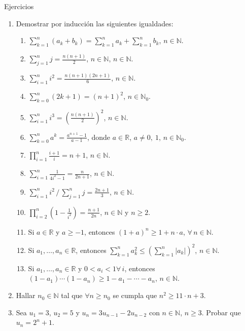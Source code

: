 \begin{section}{Ejercicios}
\begin{enumerate}
        \item Demostrar por inducción  las siguientes igualdades:
        \begin{enumerate}
            \item  $\displaystyle{ \sum_{k=1}^n (a_k + b_k) = \sum_{k=1}^n a_k + \sum_{k=1}^n b_k}$, $n\in \mathbb N$.
            \item  $\displaystyle{ \sum_{j=1}^n j = \frac{n(n+1)}{2}}$, $n\in \mathbb N$, $n\in \mathbb N$.
            \item  $\displaystyle{ \sum_{i=1}^n i^2 = \frac{n(n+1)(2n+1)}{6}}$, $n\in \mathbb N$.
            \item  $\displaystyle{ \sum_{k=0}^n (2k+1) = (n+1)^2}$, $n\in \mathbb N_0$.
            \item  $\displaystyle{ \sum_{i=1}^n i^3 = \left( \frac{n(n+1)}{2 }\right)^2}$, $n\in \mathbb N$.
            \item  $\displaystyle{ \sum_{k=0}^n a^k = \frac{a^{n+1}-1}{a-1}}$, donde $a\in {\mathbb R}$, $a \neq 0,\ 1$, $n\in \mathbb N_0$.
            \item  $\displaystyle{ \prod_{i=1}^n \frac{i+1}{i} = n+1}$, $n\in \mathbb N$.
            \item $\displaystyle{ \sum_{i=1}^n \frac{1}{4i^2-1} = \frac{n}{2n+1}}$, $n\in \mathbb N$.
            \item $\displaystyle{ \sum_{i=1}^n i^2\, /\, \sum_{j=1}^n j = \frac{2n+1}{3}}$, $n\in \mathbb N$.
            \item $\displaystyle{ \prod_{i=2}^n \left(1-\frac{1}{i^2}\right) = \frac{n+1}{2n}}$, $n\in \mathbb N$ y $ n\ge 2$.
            \item Si $a\in \mathbb R$ y $a\geq -1$, entonces $(1+a)^n\geq 1+n\cdot a$, $\forall \, n \in \mathbb N$.
            \item Si $a_1,\dots,a_n \in \mathbb R$, entonces $\displaystyle{\sum_{k=1}^n a_{k}^{2}\leq \left(\sum_{k=1}^n |a_{k}|\right)^{2}}$, $n\in \mathbb N$.
            \item Si $a_1,\dots,a_n \in \mathbb R$ y $0<a_i<1 \forall \, i$, entonces $(1-a_1)\cdots(1-a_n)\ge 1-a_1-\cdots -a_n$, $n\in \mathbb N$.
        \end{enumerate}

        \item Hallar $n_0 \in {\mathbb N}$ tal que $\forall n \ge n_0$ se cumpla que $n^2 \ge 11 \cdot n + 3$.

        \item Sea $u_1=3$, $u_2=5$ y $u_n=3 u_{n-1} - 2 u_{n-2}$ con $n\in \mathbb N$, $n\geq 3$.
        Probar que $u_n=2^n+1$.


\end{enumerate}
\end{section}
